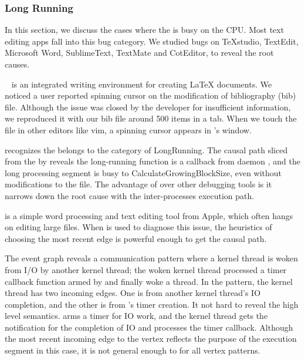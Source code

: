 \subsubsection{Long Running}

In this section, we discuss the cases where the \spinningnode is busy on the
CPU. Most text editing apps fall into this bug category. We studied bugs on
TeXstudio, TextEdit, Microsoft Word, SublimeText, TextMate and CotEditor,
to reveal the root causes.


~\cite{TeXStudio} is an integrated writing environment for
creating LaTeX documents. We noticed a user reported spinning cursor on the
modification of bibliography (bib) file. Although the issue was closed by the
developer for insufficient information, we reproduced it with our bib file
around 500 items in a  tab. When we touch the file in
other editors like vim, a spinning cursor appears in 's window.

\xxx recognizes the \spinningnode belongs to the category of LongRunning. The
causal path sliced from the \spinningnode by \xxx reveals the long-running
function is a callback from daemon , and the long processing segment
is busy to CalculateGrowingBlockSize, even without modifications to the file.
The advantage of \xxx over other debugging tools is it narrows down the root
cause with the inter-processes execution path.


 is a simple word processing and text editing tool from Apple,
which often hangs on editing large files.  When \xxx is used to diagnose
this issue, the heuristics of choosing the most recent edge is powerful enough 
to get the causal path.

The event graph reveals a communication pattern where a kernel thread is woken
from I/O by another kernel thread; the woken kernel thread processed
a timer callback function armed by  and finally woke a 
thread. In the pattern, the kernel thread has two incoming edges. One is from
another kernel thread's IO completion, and the other is from 's timer
creation. It not hard to reveal the high level semantics.  arms a timer
for IO work, and the kernel thread gets the notification for the completion of IO
and processes the timer callback. 
Although the most recent incoming edge to the vertex reflects the purpose of
the execution segment in this case, it is not general enough to for all vertex
patterns.

